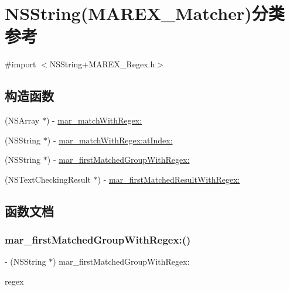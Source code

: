 \hypertarget{category_n_s_string_07_m_a_r_e_x___matcher_08}{}\section{N\+S\+String(M\+A\+R\+E\+X\+\_\+\+Matcher)分类 参考}
\label{category_n_s_string_07_m_a_r_e_x___matcher_08}


{\ttfamily \#import $<$N\+S\+String+\+M\+A\+R\+E\+X\+\_\+\+Regex.\+h$>$}

\subsection*{构造函数}
\begin{DoxyCompactItemize}
\item 
(N\+S\+Array $\ast$) -\/ \hyperlink{category_n_s_string_07_m_a_r_e_x___matcher_08_ad175f09614f02f8b86eb2f6d367c3fa5}{mar\+\_\+match\+With\+Regex\+:}
\item 
(N\+S\+String $\ast$) -\/ \hyperlink{category_n_s_string_07_m_a_r_e_x___matcher_08_ab64c4c4cd71b070be9830c5a390fb5ae}{mar\+\_\+match\+With\+Regex\+:at\+Index\+:}
\item 
(N\+S\+String $\ast$) -\/ \hyperlink{category_n_s_string_07_m_a_r_e_x___matcher_08_ae2a53aca85c85af8704226079dd212e3}{mar\+\_\+first\+Matched\+Group\+With\+Regex\+:}
\item 
(N\+S\+Text\+Checking\+Result $\ast$) -\/ \hyperlink{category_n_s_string_07_m_a_r_e_x___matcher_08_a6b887e98ff8183f99ddeebfb23689792}{mar\+\_\+first\+Matched\+Result\+With\+Regex\+:}
\end{DoxyCompactItemize}


\subsection{函数文档}
\mbox{\label{category_n_s_string_07_m_a_r_e_x___matcher_08_ae2a53aca85c85af8704226079dd212e3}} 
\subsubsection{\texorpdfstring{mar\+\_\+first\+Matched\+Group\+With\+Regex\+:()}{mar\_firstMatchedGroupWithRegex:()}}
{\footnotesize\ttfamily -\/ (N\+S\+String $\ast$) mar\+\_\+first\+Matched\+Group\+With\+Regex\+: \begin{DoxyParamCaption}\item[{(N\+S\+String $\ast$)}]{regex }\end{DoxyParamCaption}}

